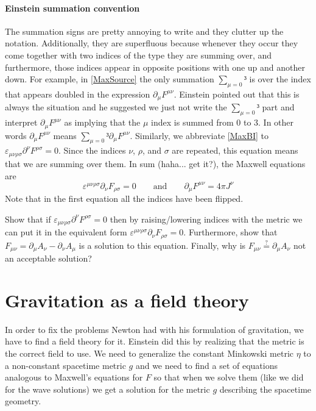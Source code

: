 \paragraph{Einstein summation convention}
The summation signs are pretty annoying to write and they clutter up the notation. Additionally, they are superfluous because whenever they occur they come together with two indices of the type they are summing over, and furthermore, those indices appear in opposite positions with one up and another down. For example, in \eqref{MaxSource} the only summation $∑_{μ =0}³$ is over the index that appears doubled in the expression $∂_μ F^{μν}$. Einstein pointed out that this is always the situation and he suggested we just not write the $∑_{μ =0}³$ part and interpret $∂_μ F^{μν}$ as implying that the $μ$ index is summed from $0$ to $3$. In other words $∂_μ F^{μν}$ means $∑_{μ =0}³∂_μ F^{μν}$. Similarly, we abbreviate \eqref{MaxBI} to $𝜀_{μ ν ρ σ} ∂^ν  F^{ρσ} = 0$. Since the indices $ν$, $ρ$, and $σ$ are repeated, this equation means that we are summing over them. In sum (haha... get it?), the Maxwell equations are 
$$
𝜀^{μ ν ρ σ} ∂_ν  F_{ρσ} = 0
\quad \quad \textrm{and}\quad \quad
∂_μ F^{μν}=4π J^ν 
$$
Note that in the first equation all the indices have been flipped. 
\begin{exercise}
Show that if $𝜀_{μ ν ρ σ} ∂^ν  F^{ρσ} = 0$ then by raising/lowering indices with the metric we can put it in the equivalent form $𝜀^{μ ν ρ σ} ∂_ν  F_{ρσ} = 0$. Furthermore, show that $F_{μν} = ∂_μ A_ν - ∂_ν A_μ$ is a solution to this equation. Finally, why is $F_{μν} \stackrel?= ∂_μ A_ν$ not an acceptable solution?
\end{exercise}

\section{Gravitation as a field theory}
In order to fix the problems Newton had with his formulation of gravitation, we have to find a field theory for it. Einstein did this by realizing that the metric is the correct field to use. We need to generalize the constant Minkowski metric $η$ to a non-constant spacetime metric $g$ and we need to find a set of equations analogous to Maxwell's equations for $F$ so that when we solve them (like we did for the wave solutions) we get a solution for the  metric $g$ describing the spacetime geometry. 

